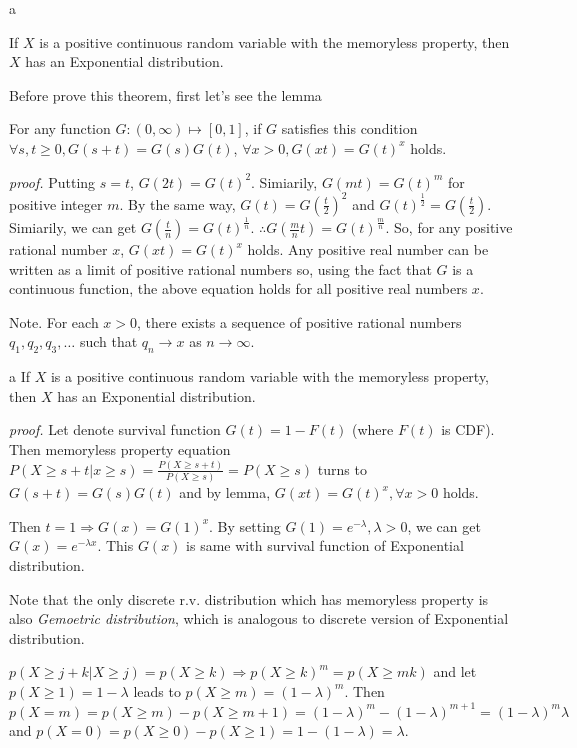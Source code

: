 \documentclass[8pt]{beamer}
\newcommand{\ti}[1]{\textit{#1}}
\begin{document}
\begin{frame}{a}

    \begin{theorem}
        If $X$ is a positive continuous random variable with the memoryless property, then $X$ has an Exponential distribution.
    \end{theorem}
    
    Before prove this theorem, first let's see the lemma

    \begin{lemma}
        For any function $G: (0, \infty) \mapsto [0,1]$, if $G$ satisfies this condition $\forall s,t\geq 0, G(s+t) = G(s)G(t)$, $\forall x >0, G(xt) = G(t)^x$ holds.
    \end{lemma}

    \ti{proof.} Putting $s = t$, $G(2t) = G(t)^2$. Simiarily, $G(mt) = G(t)^m$ for positive integer $m$. By the same way, $G(t) = G(\frac{t}{2})^2$ and $G(t)^{\frac{1}{2}} = G(\frac{t}{2})$. Simiarily, we can get $G(\frac{t}{n}) = G(t)^{\frac{1}{n}}$.
    $\therefore G(\frac{m}{n} t) = G(t)^\frac{m}{n}$. So, for any positive rational number $x$, $G(xt) = G(t)^x$ holds. Any positive real number can be written as a limit of positive rational numbers so, using the fact that $G$ is a continuous function, the above equation holds for all positive real numbers $x$.

    \bigskip
    Note. For each $x > 0$, there exists a sequence of positive rational numbers $q_1, q_2, q_3, \dots$ such that $q_n \rightarrow x$ as $n \rightarrow \infty$.
\end{frame}

\begin{frame}{a}
If $X$ is a positive continuous random variable with the memoryless property, then $X$ has an Exponential distribution.

\bigskip
\textit{proof.}
Let denote survival function $G(t) = 1- F(t)$ (where $F(t)$ is CDF). Then memoryless property equation $P(X \geq s+t | x\geq s) = \frac{P(X \geq s+t)}{P(X \geq s)} = P(X\geq s)$ turns to $G(s+t) = G(s)G(t)$ and by lemma, $G(xt) = G(t)^x, \forall x >0$ holds.

Then $t=1 \Rightarrow G(x) = G(1)^x$. By setting $G(1) = e^{-\lambda}, \lambda > 0$, we can get $G(x) = e^{-\lambda x}$. This $G(x)$ is same with survival function of Exponential distribution.

\bigskip
Note that the only discrete r.v. distribution which has memoryless property is also \ti{Gemoetric distribution}, which is analogous to discrete version of Exponential distribution.

$p(X\geq j+k|X\geq j) = p(X\geq k) \Rightarrow p(X \geq k)^m = p(X \geq mk)$ and let $p(X \geq 1) = 1-\lambda $ leads to $p(X \geq m) = (1-\lambda)^m$. Then $p(X = m)= p(X\geq m) - p(X\geq m+1) = (1-\lambda)^{m} - (1-\lambda)^{m+1}  = (1-\lambda)^m \lambda$ and $p(X = 0) = p(X \geq 0) - p(X \geq 1) = 1 - (1 - \lambda) = \lambda$.
\end{frame}
\end{document}
